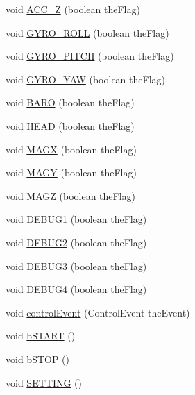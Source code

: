 \begin{DoxyCompactItemize}
\item 
void \hyperlink{classMultiWiiConf_afdc8f5a7f9dc70e2c23aa04418a2b80d}{A\-C\-C\-\_\-\-Z} (boolean the\-Flag)
\item 
void \hyperlink{classMultiWiiConf_ad2bba48b0cd3fcb136bb9a09ecf0cb97}{G\-Y\-R\-O\-\_\-\-R\-O\-L\-L} (boolean the\-Flag)
\item 
void \hyperlink{classMultiWiiConf_a5ce8a311ad06521d726afa6df0fb1ee1}{G\-Y\-R\-O\-\_\-\-P\-I\-T\-C\-H} (boolean the\-Flag)
\item 
void \hyperlink{classMultiWiiConf_a8de2c98857b1124230c10e3ae343accd}{G\-Y\-R\-O\-\_\-\-Y\-A\-W} (boolean the\-Flag)
\item 
void \hyperlink{classMultiWiiConf_ab2b544742052cc0f398e6d254dbf7208}{B\-A\-R\-O} (boolean the\-Flag)
\item 
void \hyperlink{classMultiWiiConf_a60b6a9d19c3a12f0a651e4a5fc4d2041}{H\-E\-A\-D} (boolean the\-Flag)
\item 
void \hyperlink{classMultiWiiConf_aa99d38abfa52b1977943450ab0b913ee}{M\-A\-G\-X} (boolean the\-Flag)
\item 
void \hyperlink{classMultiWiiConf_a255680567522dc391e65783f7dab433a}{M\-A\-G\-Y} (boolean the\-Flag)
\item 
void \hyperlink{classMultiWiiConf_aee488258d4ab0d58342d8be981773d49}{M\-A\-G\-Z} (boolean the\-Flag)
\item 
void \hyperlink{classMultiWiiConf_ace07c9638854159fd9648817459846de}{D\-E\-B\-U\-G1} (boolean the\-Flag)
\item 
void \hyperlink{classMultiWiiConf_a25f6849faf310fc390b3a509a1308edd}{D\-E\-B\-U\-G2} (boolean the\-Flag)
\item 
void \hyperlink{classMultiWiiConf_a4ee09f16beb6d49cc21b202a163af55d}{D\-E\-B\-U\-G3} (boolean the\-Flag)
\item 
void \hyperlink{classMultiWiiConf_a361d6de42848acf39896f4e1201028c2}{D\-E\-B\-U\-G4} (boolean the\-Flag)
\item 
void \hyperlink{classMultiWiiConf_a9b359c242f40d6dc074f45fbb79dee15}{control\-Event} (Control\-Event the\-Event)
\item 
void \hyperlink{classMultiWiiConf_a5d3204c23c47ac82aa08c5043022a504}{b\-S\-T\-A\-R\-T} ()
\item 
void \hyperlink{classMultiWiiConf_a3e0767e03653e3486978e2ba9a7463ea}{b\-S\-T\-O\-P} ()
\item 
void \hyperlink{classMultiWiiConf_a912ca48c44dc4cd130f75ecdccf7da84}{S\-E\-T\-T\-I\-N\-G} ()
\item 

\end{DoxyCompactItemize}
